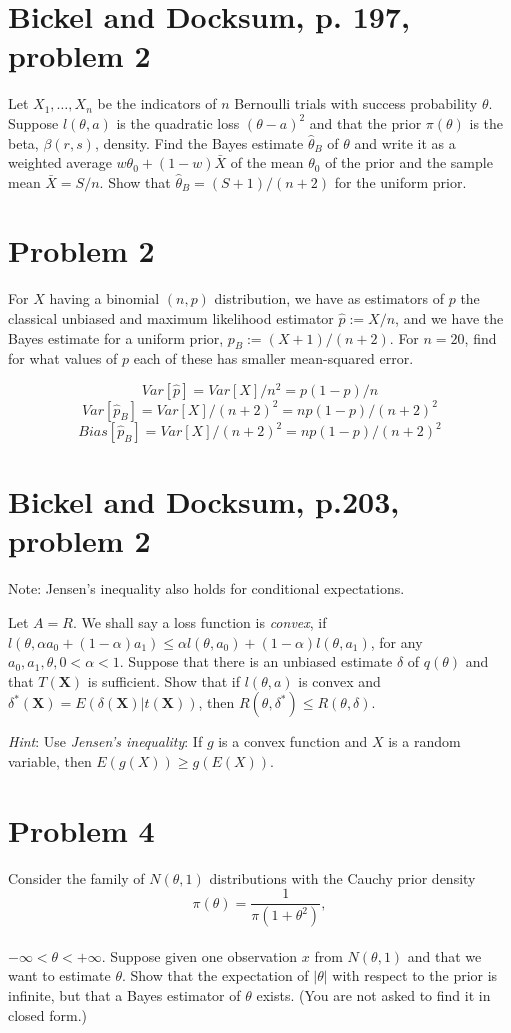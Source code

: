 \documentclass[11pt]{article}
\newcommand{\ProbS}{\iftrue}
\newcommand{\ProbE}{\fi}
\begin{document}
\section{Bickel and Docksum, p. 197, problem 2}
\ProbS
Let $X_1, \dots, X_n$ be the indicators of $n$ Bernoulli trials with success probability $\theta$. Suppose $l(\theta, a)$ is the quadratic loss $(\theta-a)^2$ and that the prior $\pi(\theta)$ is the beta,
$\beta(r, s)$, density. Find the Bayes estimate $\hat{\theta}_B$ of
$\theta$ and write it as a weighted average $w\theta_0 + (1-w)\bar{X}$ of the mean $\theta_0$ of the prior and the sample mean $\bar{X} = S/n$. Show that $\hat{\theta}_B = (S+1)/(n+2)$ for the uniform prior.
\ProbE

\section{Problem 2}
\ProbS
For $X$ having a binomial $(n,p)$ distribution, we have as estimators of $p$ the classical unbiased and maximum likelihood estimator
$
\hat{p} := X/n
$, and we have the Bayes estimate for a uniform prior,
$
p_B := (X+1)/(n+2)
$. For $n=20$, find for what values of $p$ each of these has smaller mean-squared error.
\ProbE

$$
Var[\hat{p}] = Var[X] / n^2 = p(1-p)/n
$$
$$
Var[\hat{p}_B] = Var[X] / (n+2)^2 = np(1-p)/(n+2)^2
$$
$$
Bias[\hat{p}_B] = Var[X] / (n+2)^2 = np(1-p)/(n+2)^2
$$
\section{Bickel and Docksum, p.203, problem 2}
\ProbS
Note: Jensen's inequality also holds for conditional expectations.

Let $A=R$. We shall say a loss function is \emph{convex}, if
$l(\theta, \alpha a_0 + (1-\alpha)a_1) \leq
\alpha l(\theta, a_0) + (1-\alpha)l(\theta, a_1)$,
for any $a_0, a_1, \theta, 0<\alpha<1$.
Suppose that there is an unbiased estimate $\delta$ of $q(\theta)$
and that $T(\mathbf{X})$ is sufficient.
Show that if $l(\theta, a)$ is convex and
$\delta^{*}(\mathbf{X}) = E(\delta(\mathbf{X}) | t(\mathbf{X}))$,
then $R(\theta, \delta^{*}) \leq R(\theta, \delta)$.

\emph{Hint}: Use \emph{Jensen's inequality}: If $g$ is a convex function and $X$ is a random variable, then $E(g(X)) \geq g(E(X))$.
\ProbE

\section{Problem 4}
\ProbS
Consider the family of $N(\theta, 1)$ distributions with the Cauchy prior density
$$
\pi(\theta) = \frac{1}{\pi(1+\theta^2)},
$$
\\
$-\infty < \theta < +\infty$.
Suppose given one observation $x$ from $N(\theta, 1)$
and that we want to estimate $\theta$.
Show that the expectation of $|\theta|$ with respect to the prior is infinite, but that a Bayes estimator of $\theta$ exists.
(You are not asked to find it in closed form.)
\ProbE
\end{document}

